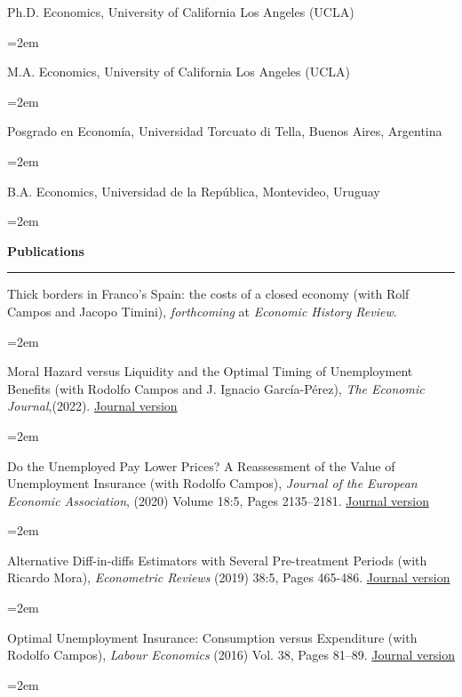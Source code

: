 \documentclass[12pt]{article}
\newcommand{\sepspace}{\vspace*{0.5em}}		%
\newcommand{\NewPart}[1]{ \vspace*{0.4cm} \noindent \large \textbf{#1}
\par \normalsize \normalfont \vspace*{-0.5cm} \noindent\rule{\textwidth}{1.8pt} \vspace*{-0.75cm} }
\newcommand{\EducationEntry}[4]{
		\noindent #1 \hfill      %
		\noindent #2 %
		\par  %
		\noindent \textit{#3} \par        %
		\noindent\hangindent=2em\hangafter=0  #4 %
		\normalsize \par}
\begin{document}
\EducationEntry{Ph.D. Economics, University of California Los Angeles (UCLA)}{2008}{}{}

\EducationEntry{M.A. Economics, University of California Los Angeles (UCLA)}{2004}{}{}

\EducationEntry{Posgrado en Econom\'ia, Universidad Torcuato di Tella, Buenos Aires, Argentina}{2001}{}{}

\EducationEntry{B.A. Economics, Universidad de la República, Montevideo, Uruguay}{1999}{}{}

\vspace*{-0.5cm}
\NewPart{Publications}{}

\EducationEntry{Thick borders in Franco’s Spain: the costs of a closed economy (with Rolf Campos and Jacopo Timini), \textit{forthcoming} at \textit{Economic History Review}.}{}{}{}

\vspace*{0.25cm}

\EducationEntry{Moral Hazard versus Liquidity and the Optimal Timing of Unemployment Benefits (with Rodolfo Campos and J. Ignacio García-Pérez), \textit{The Economic Journal},(2022).}{\href{https://academic.oup.com/ej/article-abstract/132/648/2674/6596157?redirectedFrom=fulltext&login=false}{Journal version}}{}{}

\vspace*{0.25cm}

\EducationEntry{Do the Unemployed Pay Lower Prices? A Reassessment of the Value of Unemployment Insurance (with Rodolfo Campos), \textit{Journal of the European Economic Association}, (2020) Volume 18:5, Pages 2135–2181.} {\href{https://academic.oup.com/jeea/advance-article/doi/10.1093/jeea/jvz043/5607409?guestAccessKey=14e0bd06-6410-43f0-aa64-677e87dfef66}{Journal version}}{}{}

\vspace*{-0.25cm}


\EducationEntry{Alternative Diff-in-diffs Estimators with Several Pre-treatment Periods (with Ricardo Mora), \textit{Econometric Reviews} (2019) 38:5, Pages 465-486.}{\href{http://www.tandfonline.com/doi/abs/10.1080/07474938.2017.1348683}{Journal version}}{}{}

\vspace*{-0.25cm}

\EducationEntry{Optimal Unemployment Insurance: Consumption versus Expenditure (with Rodolfo Campos), \textit{Labour Economics} (2016) Vol. 38, Pages 81–89.}{\href{https://www.sciencedirect.com/science/article/abs/pii/S0927537115001232}{Journal version}}{}{}
\end{document}
